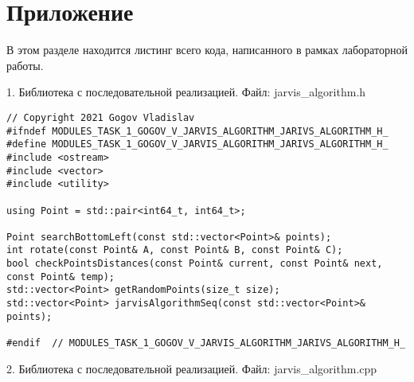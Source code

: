 \documentclass{report}
\begin{document}
\section*{Приложение}
В этом разделе находится листинг всего кода, написанного в рамках лабораторной работы.
\par 1. Библиотека с последовательной реализацией. Файл: jarvis\_algorithm.h
\begin{lstlisting}
// Copyright 2021 Gogov Vladislav
#ifndef MODULES_TASK_1_GOGOV_V_JARVIS_ALGORITHM_JARIVS_ALGORITHM_H_
#define MODULES_TASK_1_GOGOV_V_JARVIS_ALGORITHM_JARIVS_ALGORITHM_H_
#include <ostream>
#include <vector>
#include <utility>

using Point = std::pair<int64_t, int64_t>;

Point searchBottomLeft(const std::vector<Point>& points);
int rotate(const Point& A, const Point& B, const Point& C);
bool checkPointsDistances(const Point& current, const Point& next, const Point& temp);
std::vector<Point> getRandomPoints(size_t size);
std::vector<Point> jarvisAlgorithmSeq(const std::vector<Point>& points);

#endif  // MODULES_TASK_1_GOGOV_V_JARVIS_ALGORITHM_JARIVS_ALGORITHM_H_
\end{lstlisting}
\par 2. Библиотека с последовательной реализацией. Файл: jarvis\_algorithm.cpp
\end{document}
